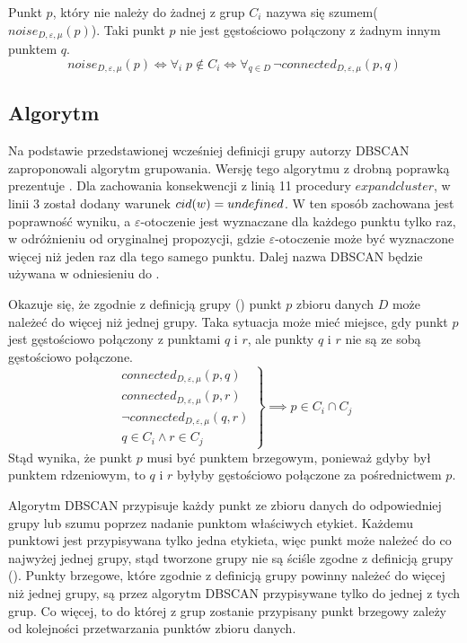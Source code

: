 

Punkt $ p $, który nie należy do żadnej z grup $ C_i $ nazywa się szumem\linebreak ($ noise_{D,\varepsilon,\mu}(p) $). Taki punkt $ p $ nie jest gęstościowo połączony z żadnym innym punktem $ q $.
\begin{equation}
	noise_{D,\varepsilon,\mu}(p) \iff \forall_i \;p\notin C_i \iff \forall_{q \in D} \,\neg connected_{D,\varepsilon,\mu}(p,q)
\end{equation}
	
\subsection{Algorytm}
Na podstawie przedstawionej wcześniej definicji grupy autorzy DBSCAN zaproponowali algorytm grupowania. Wersję tego algorytmu z drobną poprawką prezentuje . Dla zachowania konsekwencji z linią 11 procedury $ expandcluster $, w linii 3 został dodany warunek $ cid(w) = unde\hspace{-0.1em}f\hspace{-0.1em}{}ined $. W ten sposób zachowana jest poprawność wyniku, a $ \varepsilon $-otoczenie jest wyznaczane dla każdego punktu tylko raz, w odróżnieniu od oryginalnej propozycji, gdzie $ \varepsilon $-otoczenie może być wyznaczone więcej niż jeden raz dla tego samego punktu. Dalej nazwa DBSCAN będzie używana w odniesieniu do .

Okazuje się, że zgodnie z definicją grupy () punkt $ p $ zbioru danych $ D $ może należeć do więcej niż jednej grupy. Taka sytuacja może mieć miejsce, gdy punkt $ p $ jest gęstościowo połączony z punktami $ q $ i $ r $, ale punkty $ q $ i $ r $ nie są ze sobą gęstościowo połączone.
\begin{equation}
  \left. \begin{array}{r}
		connected_{D,\varepsilon,\mu}(p, q) \\
		connected_{D,\varepsilon,\mu}(p, r) \\
		\neg connected_{D,\varepsilon,\mu}(q, r) \\
	 	q \in C_i \land r \in C_j
	\end{array} \right\}
	\implies	p \in C_i \cap C_j
\end{equation}
Stąd wynika, że punkt $ p $ musi być punktem brzegowym, ponieważ gdyby był punktem rdzeniowym, to $ q $ i $ r $ byłyby gęstościowo połączone za pośrednictwem $ p $.

Algorytm DBSCAN przypisuje każdy punkt ze zbioru danych do odpowiedniej grupy lub szumu poprzez nadanie punktom właściwych etykiet. Każdemu punktowi jest przypisywana tylko jedna etykieta, więc punkt może należeć do co najwyżej jednej grupy, stąd tworzone grupy nie są ściśle zgodne z definicją grupy (). Punkty brzegowe, które zgodnie z definicją grupy powinny należeć do więcej niż jednej grupy, są przez algorytm DBSCAN przypisywane tylko do jednej z tych grup. Co więcej, to do której z grup zostanie przypisany punkt brzegowy zależy od kolejności przetwarzania punktów zbioru danych.

